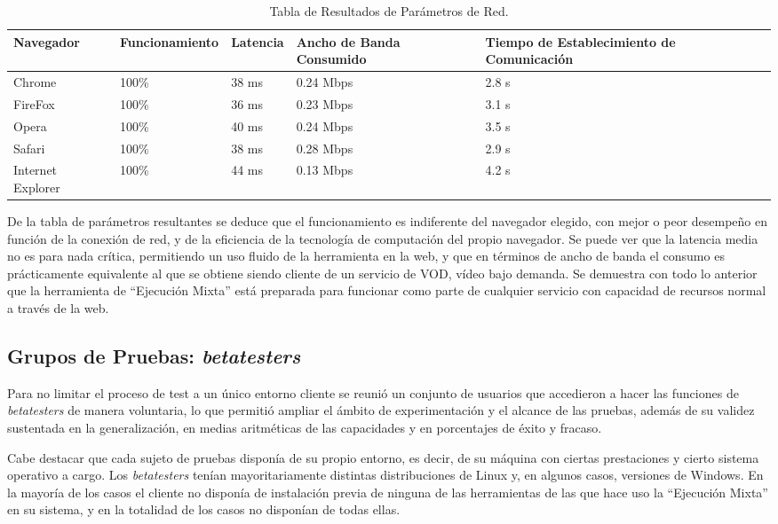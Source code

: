 \begin{table}[htbp]
\begin{center}
\begin{tabular}{| p{1.8cm}| p{2.6cm} | p{1.7cm}| p{2.4cm}| p{3cm}|}
\hline
Navegador & Funcionamiento & Latencia & Ancho de Banda Consumido & Tiempo de Establecimiento de Comunicación \\
\hline \hline
Chrome & 100\% & 38 ms & 0.24 Mbps & 2.8 s\\ \hline
FireFox & 100\% & 36 ms & 0.23 Mbps & 3.1 s\\ \hline
Opera & 100\% & 40 ms & 0.24 Mbps & 3.5 s\\ \hline
Safari & 100\% & 38 ms & 0.28 Mbps & 2.9 s\\ \hline
Internet Explorer & 100\% & 44 ms & 0.13 Mbps & 4.2 s\\ \hline
\end{tabular}
\caption{Tabla de Resultados de Parámetros de Red.}
\label{tabla:pros_cons}
\end{center}
\end{table}

De la tabla de parámetros resultantes se deduce que el funcionamiento es indiferente del navegador elegido, con mejor o peor desempeño en función de la conexión de red, y de la eficiencia de la tecnología de computación del propio navegador. Se puede ver que la latencia media no es para nada crítica, permitiendo un uso fluido de la herramienta en la web, y que en términos de ancho de banda el consumo es prácticamente equivalente al que se obtiene siendo cliente de un servicio de VOD, vídeo bajo demanda. Se demuestra con todo lo anterior que la herramienta de ``Ejecución Mixta'' está preparada para funcionar como parte de cualquier servicio con capacidad de recursos normal a través de la web.

\subsection{Grupos de Pruebas: \textit{betatesters}}

Para no limitar el proceso de test a un único entorno cliente se reunió un conjunto de usuarios que accedieron a hacer las funciones de \textit{betatesters} de manera voluntaria, lo que permitió ampliar el ámbito de experimentación y el alcance de las pruebas, además de su validez sustentada en la generalización, en medias aritméticas de las capacidades y en porcentajes de éxito y fracaso.

Cabe destacar que cada sujeto de pruebas disponía de su propio entorno, es decir, de su máquina con ciertas prestaciones y cierto sistema operativo a cargo. Los \textit{betatesters} tenían mayoritariamente distintas distribuciones de Linux y, en algunos casos, versiones de Windows. En la mayoría de los casos el cliente no disponía de instalación previa de ninguna de las herramientas de las que hace uso la ``Ejecución Mixta'' en su sistema, y en la totalidad de los casos no disponían de todas ellas.

